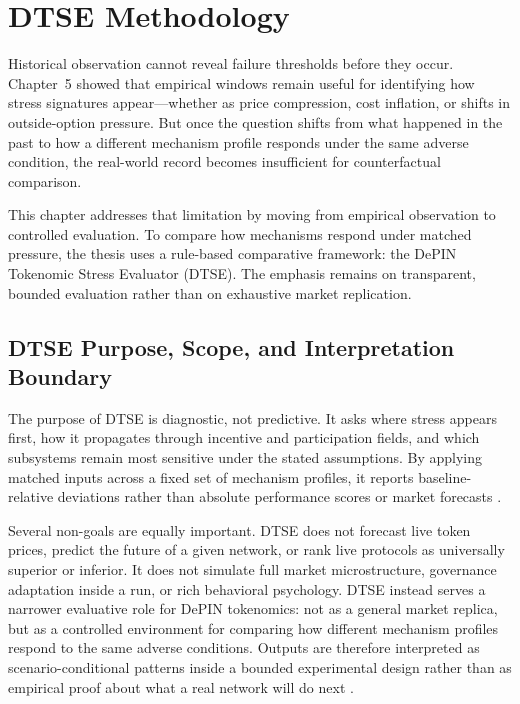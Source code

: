 \section{DTSE Methodology}
\label{sec:dtse_methodology}

Historical observation cannot reveal failure thresholds before they occur. Chapter~5 showed that empirical windows remain useful for identifying how stress signatures appear—whether as price compression, cost inflation, or shifts in outside-option pressure. But once the question shifts from what happened in the past to how a different mechanism profile responds under the same adverse condition, the real-world record becomes insufficient for counterfactual comparison.

This chapter addresses that limitation by moving from empirical observation to controlled evaluation. To compare how mechanisms respond under matched pressure, the thesis uses a rule-based comparative framework: the DePIN Tokenomic Stress Evaluator (DTSE). The emphasis remains on transparent, bounded evaluation rather than on exhaustive market replication.

\subsection{DTSE Purpose, Scope, and Interpretation Boundary}
The purpose of DTSE is diagnostic, not predictive. It asks where stress appears first, how it propagates through incentive and participation fields, and which subsystems remain most sensitive under the stated assumptions. By applying matched inputs across a fixed set of mechanism profiles, it reports baseline-relative deviations rather than absolute performance scores or market forecasts \cite{Morris2019, Braakman2022}.

Several non-goals are equally important. DTSE does not forecast live token prices, predict the future of a given network, or rank live protocols as universally superior or inferior. It does not simulate full market microstructure, governance adaptation inside a run, or rich behavioral psychology. DTSE instead serves a narrower evaluative role for DePIN tokenomics: not as a general market replica, but as a controlled environment for comparing how different mechanism profiles respond to the same adverse conditions. Outputs are therefore interpreted as scenario-conditional patterns inside a bounded experimental design rather than as empirical proof about what a real network will do next \cite{Morris2019, Collins2024}.

